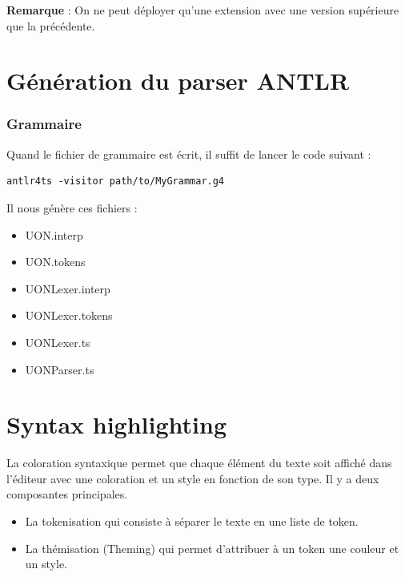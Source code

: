\documentclass[
    iict, %
    il, %
]{heig-tb}
\begin{document}
\textbf{Remarque } : On ne peut déployer qu'une extension avec une version supérieure que la précédente. %




\section{Génération du parser ANTLR}
\subsubsection{Grammaire}

Quand le fichier de grammaire est écrit, il suffit de lancer le code suivant :

\begin{lstlisting}[frame=single]
    antlr4ts -visitor path/to/MyGrammar.g4
\end{lstlisting}

Il nous génère ces fichiers :
\begin{itemize}
    \item UON.interp
    \item UON.tokens
    \item UONLexer.interp
    \item UONLexer.tokens
    \item UONLexer.ts
    \item UONParser.ts
\end{itemize}

\section{Syntax highlighting}


La coloration syntaxique permet que chaque élément du texte soit affiché dans l'éditeur avec une coloration et un style en fonction de son type.
Il y a deux composantes principales. %
\begin{itemize}
    \item La tokenisation qui consiste à séparer le texte en une liste de token.
    \item La thémisation (Theming) qui permet d'attribuer à un token une couleur et un style.
\end{itemize}
\end{document}
